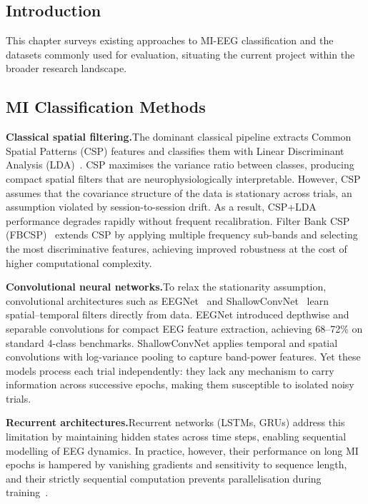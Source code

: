 \documentclass[12pt, a4paper]{article}
\begin{document}
\subsection{Introduction}

This chapter surveys existing approaches to MI-EEG classification and the datasets commonly used for evaluation, situating the current project within the broader research landscape.

\subsection{MI Classification Methods}

\textbf{Classical spatial filtering.}\quad The dominant classical pipeline extracts Common Spatial Patterns (CSP) features and classifies them with Linear Discriminant Analysis (LDA)~\cite{hameed2025enhancing}. CSP maximises the variance ratio between classes, producing compact spatial filters that are neurophysiologically interpretable. However, CSP assumes that the covariance structure of the data is stationary across trials, an assumption violated by session-to-session drift. As a result, CSP+LDA performance degrades rapidly without frequent recalibration. Filter Bank CSP (FBCSP)~\cite{ang2008fbcsp} extends CSP by applying multiple frequency sub-bands and selecting the most discriminative features, achieving improved robustness at the cost of higher computational complexity.

\textbf{Convolutional neural networks.}\quad To relax the stationarity assumption, convolutional architectures such as EEGNet~\cite{lawhern2018eegnet} and ShallowConvNet~\cite{schirrmeister2017deep} learn spatial--temporal filters directly from data. EEGNet introduced depthwise and separable convolutions for compact EEG feature extraction, achieving 68--72\% on standard 4-class benchmarks. ShallowConvNet applies temporal and spatial convolutions with log-variance pooling to capture band-power features. Yet these models process each trial independently: they lack any mechanism to carry information across successive epochs, making them susceptible to isolated noisy trials.

\textbf{Recurrent architectures.}\quad Recurrent networks (LSTMs, GRUs) address this limitation by maintaining hidden states across time steps, enabling sequential modelling of EEG dynamics. In practice, however, their performance on long MI epochs is hampered by vanishing gradients and sensitivity to sequence length, and their strictly sequential computation prevents parallelisation during training~\cite{vaswani2017attention}.
\end{document}
